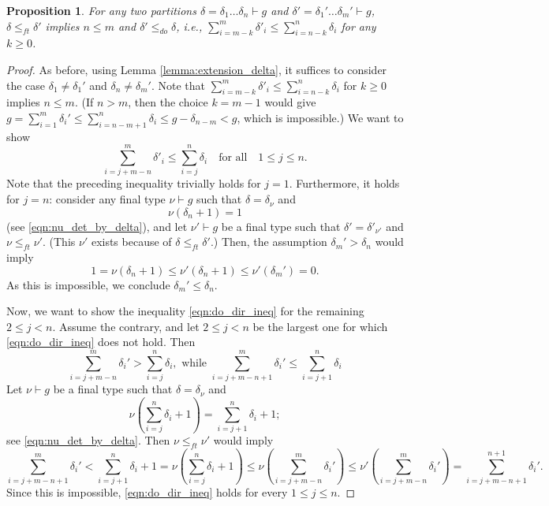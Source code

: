 \documentclass[11pt]{amsart}
\numberwithin{equation}{section}
\theoremstyle{plain}
\newcommand{\<}{\left \langle}
\renewcommand{\>}{\right \rangle}
\newtheorem{prop}[thm]{Proposition}
\theoremstyle{definition}
\theoremstyle{remark}
\begin{document}
\begin{prop}
\label{prop:ft_do}
For any two partitions $\delta = \delta_{1}\ldots\delta_{n}\vdash g$ and $\delta' = \delta_1'\ldots \delta_m'\vdash g$, $\delta \leq_{ft} \delta'$ implies $n \leq m$ and $\delta' \leq_{do} \delta$, i.e., $\sum_{i = m - k}^{m}\delta'_i \leq \sum_{i = n - k}^{n}\delta_i$ for any $k \geq 0$. 
\end{prop}
\begin{proof}
As before, using Lemma \ref{lemma:extension_delta}, it suffices to consider the case $\delta_1 \neq \delta_1'$ and $\delta_n \neq \delta_m'$. Note that $\sum_{i = m - k}^{m}\delta'_i \leq \sum_{i = n - k}^{n}\delta_i$ for $k \geq 0$ implies $n \leq m$. (If $n > m$, then the choice $k = m - 1$ would give $g = \sum_{i = 1}^m\delta_i' \leq \sum_{i = n - m + 1}^n\delta_i \leq g - \delta_{n - m} < g$, which is impossible.) 
We want to show 
\begin{equation}
\sum_{i = j + m - n}^{m}\delta'_i \leq \sum_{i = j}^{n}\delta_i \quad \text{for all}\quad 1 \leq j \leq n.
\label{eqn:do_dir_ineq}    
\end{equation}
Note that the preceding inequality trivially holds for $j = 1$.
Furthermore, it holds for $j = n$:
consider any final type $\nu \vdash g$ such that $\delta = \delta_{\nu}$ and $$\nu(\delta_n + 1) = 1$$ (see \eqref{eqn:nu_det_by_delta}), and let $\nu' \vdash g$ be a final type such that $\delta' = \delta'_{\nu'}$ and $\nu \leq_{ft} \nu'$. (This $\nu'$ exists because of $\delta \leq_{ft} \delta'$.) Then, the assumption $\delta_m' > \delta_n$ would imply $$1 = \nu(\delta_n + 1)\leq \nu'(\delta_n + 1) \leq \nu'(\delta_m') = 0.$$ As this is impossible, we conclude $\delta_m'\leq \delta_n$. 

Now, we want to show the inequality \eqref{eqn:do_dir_ineq} for the remaining $2 \leq j < n$. Assume the contrary, and let $2\leq j < n$ be the largest one for which \eqref{eqn:do_dir_ineq} does not hold. Then $$\sum_{i = j  + m - n}^{m}\delta_i' > \sum_{i = j}^{n}\delta_i, \text{ while } \sum_{i = j  + m - n + 1}^{m}\delta_i' \leq \sum_{i = j + 1}^{n}\delta_i$$
Let $\nu \vdash g$ be a final type such that $\delta = \delta_{\nu}$ and $$\nu(\sum_{i = j}^{n}\delta_i + 1) = \sum_{i = j + 1}^{n}\delta_i + 1;$$ see \eqref{eqn:nu_det_by_delta}. Then $\nu \leq_{ft} \nu'$ would imply $$\sum_{i = j + m -n + 1}^{m}\delta_i'< \sum_{i = j + 1}^{n}\delta_i + 1 = \nu(\sum_{i = j}^{n}\delta_i + 1) \leq \nu(\sum_{i = j + m - n}^{m}\delta_i') \leq \nu'(\sum_{i = j + m - n}^{m}\delta_i') = \sum_{i = j + m - n + 1}^{n + 1}\delta_i'.$$
Since this is impossible, \eqref{eqn:do_dir_ineq} holds for every $1 \leq j \leq n$. 
\end{proof}
\end{document}
